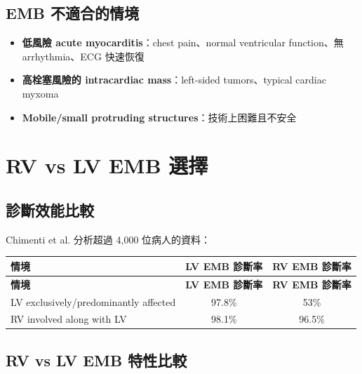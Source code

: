 \documentclass[12pt,a4paper]{article}
\begin{document}
\subsection{EMB 不適合的情境}

\begin{itemize}
    \item \textbf{低風險 acute myocarditis}：chest pain、normal ventricular function、無 arrhythmia、ECG 快速恢復
    \item \textbf{高栓塞風險的 intracardiac mass}：left-sided tumors、typical cardiac myxoma
    \item \textbf{Mobile/small protruding structures}：技術上困難且不安全
\end{itemize}

\section{RV vs LV EMB 選擇}

\subsection{診斷效能比較}

Chimenti et al. 分析超過 4,000 位病人的資料：

\begin{longtable}{lcc}
\toprule
\textbf{情境} & \textbf{LV EMB 診斷率} & \textbf{RV EMB 診斷率} \\
\midrule
\endfirsthead

\toprule
\textbf{情境} & \textbf{LV EMB 診斷率} & \textbf{RV EMB 診斷率} \\
\midrule
\endhead

\bottomrule
\endfoot

LV exclusively/predominantly affected & 97.8\% & 53\% \\
RV involved along with LV & 98.1\% & 96.5\% \\
\bottomrule
\end{longtable}

\subsection{RV vs LV EMB 特性比較}
\end{document}
